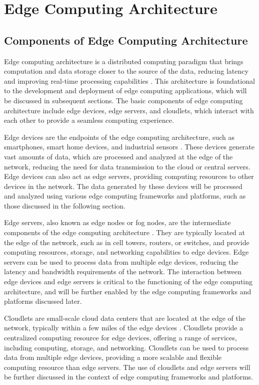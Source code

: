 \documentclass[11pt]{article}
\begin{document}
\section{Edge Computing Architecture}

\subsection{Components of Edge Computing Architecture}

Edge computing architecture is a distributed computing paradigm that brings computation and data storage closer to the source of the data, reducing latency and improving real-time processing capabilities \cite{ref2}. This architecture is foundational to the development and deployment of edge computing applications, which will be discussed in subsequent sections. The basic components of edge computing architecture include edge devices, edge servers, and cloudlets, which interact with each other to provide a seamless computing experience.

Edge devices are the endpoints of the edge computing architecture, such as smartphones, smart home devices, and industrial sensors \cite{ref3}. These devices generate vast amounts of data, which are processed and analyzed at the edge of the network, reducing the need for data transmission to the cloud or central servers. Edge devices can also act as edge servers, providing computing resources to other devices in the network. The data generated by these devices will be processed and analyzed using various edge computing frameworks and platforms, such as those discussed in the following section.

Edge servers, also known as edge nodes or fog nodes, are the intermediate components of the edge computing architecture \cite{ref29}. They are typically located at the edge of the network, such as in cell towers, routers, or switches, and provide computing resources, storage, and networking capabilities to edge devices. Edge servers can be used to process data from multiple edge devices, reducing the latency and bandwidth requirements of the network. The interaction between edge devices and edge servers is critical to the functioning of the edge computing architecture, and will be further enabled by the edge computing frameworks and platforms discussed later.

Cloudlets are small-scale cloud data centers that are located at the edge of the network, typically within a few miles of the edge devices \cite{ref1}. Cloudlets provide a centralized computing resource for edge devices, offering a range of services, including computing, storage, and networking. Cloudlets can be used to process data from multiple edge devices, providing a more scalable and flexible computing resource than edge servers. The use of cloudlets and edge servers will be further discussed in the context of edge computing frameworks and platforms.
\end{document}
